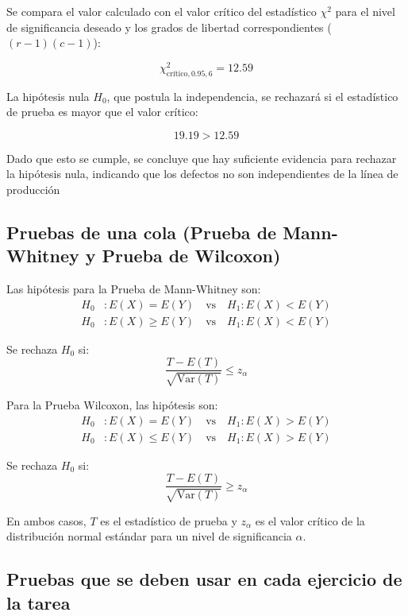 \documentclass{article}
\begin{document}
Se compara el valor calculado con el valor crítico del estadístico \( \chi^2 \) para el nivel de significancia deseado y los grados de libertad correspondientes (\( (r-1)(c-1) \)):

\[
    \chi^2_{\text{crítico}, 0.95, 6} = 12.59
\]

La hipótesis nula \( H_0 \), que postula la independencia, se rechazará si el estadístico de prueba es mayor que el valor crítico:

\[
    19.19 > 12.59
\]

Dado que esto se cumple, se concluye que hay suficiente evidencia para rechazar la hipótesis nula, indicando que los defectos no son independientes de la línea de producción

\subsection{Pruebas de una cola (Prueba de Mann-Whitney y Prueba de Wilcoxon)}

Las hipótesis para la Prueba de Mann-Whitney son:
\begin{align*}
    H_0 & : E(X) = E(Y) \quad \text{vs} \quad H_1: E(X) < E(Y)    \\
    H_0 & : E(X) \geq E(Y) \quad \text{vs} \quad H_1: E(X) < E(Y)
\end{align*}

Se rechaza \(H_0\) si:
\begin{equation*}
    \frac{T - E(T)}{\sqrt{\text{Var}(T)}} \leq z_{\alpha}
\end{equation*}

Para la Prueba Wilcoxon, las hipótesis son:
\begin{align*}
    H_0 & : E(X) = E(Y) \quad \text{vs} \quad H_1: E(X) > E(Y)    \\
    H_0 & : E(X) \leq E(Y) \quad \text{vs} \quad H_1: E(X) > E(Y)
\end{align*}

Se rechaza \(H_0\) si:
\begin{equation*}
    \frac{T - E(T)}{\sqrt{\text{Var}(T)}} \geq z_{\alpha}
\end{equation*}

En ambos casos, \( T \) es el estadístico de prueba y \( z_{\alpha} \) es el valor crítico de la distribución normal estándar para un nivel de significancia \( \alpha \).


\subsection{Pruebas que se deben usar en cada ejercicio de la tarea}
\end{document}
